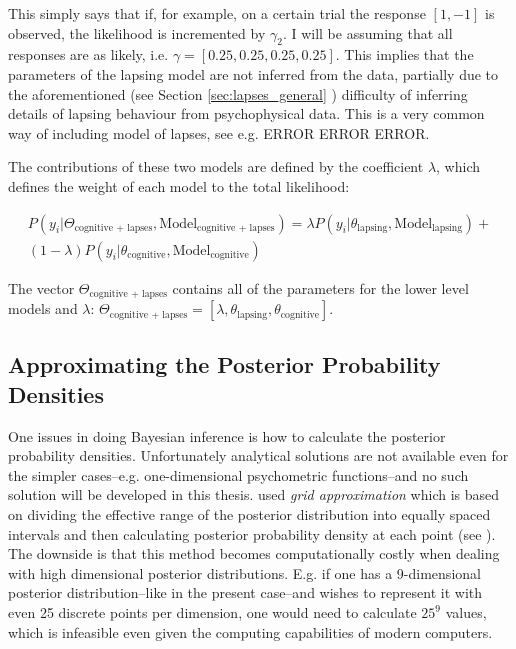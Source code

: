 \documentclass{article}\usepackage{knitr}
\begin{document}
This simply says that if, for example, on a certain trial the response $[1,-1]$ is observed, the likelihood is incremented by $\gamma_2$. I will be assuming that all responses are as likely, i.e. $\gamma = [0.25, 0.25, 0.25, 0.25]$. This implies that the parameters of the lapsing model are not inferred from the data, partially due to the aforementioned (see Section \ref{sec:lapses_general} \textit{}) difficulty of inferring details of lapsing behaviour from psychophysical data. This is a very common way of including model of lapses, see e.g. ERROR ERROR ERROR.

The contributions of these two models are defined by the coefficient $\lambda$, which defines the weight of each model to the total likelihood:

\begin{multline}
\label{eq:lower_level_hiera}
P(y_i |\Theta_{\text{cognitive + lapses}}, \text{Model}_{\text{cognitive + lapses}}) = \lambda P(y_i | \theta_{\text{lapsing}}, \text{Model}_{\text{lapsing}}) + \\ (1 - \lambda) P(y_i | \theta_{\text{cognitive}}, \text{Model}_{\text{cognitive}})
\end{multline}

The vector $\Theta_{\text{cognitive + lapses}}$ contains all of the parameters for the lower level models and $\lambda$: $\Theta_{\text{cognitive + lapses}} = [\lambda, \theta_{\text{lapsing}}, \theta_{\text{cognitive}}]$.

\subsection{Approximating the Posterior Probability Densities}

One issues in doing Bayesian inference is how to calculate the posterior probability densities. Unfortunately analytical solutions are not available even for the simpler cases--e.g. one-dimensional psychometric functions--and no such solution will be developed in this thesis. \citet{kontsevichtyler1999} used \textit{grid approximation} which is based on dividing the effective range of the posterior distribution into equally spaced intervals and then calculating posterior probability density at each point (see \citealt[p.144]{kruschke2015}). The downside is that this method becomes computationally costly when dealing with high dimensional posterior distributions. E.g. if one has a 9-dimensional posterior distribution--like in the present case--and wishes to represent it with even 25 discrete points per dimension, one would need to calculate $25^9$ values, which is infeasible even given the computing capabilities of modern computers.
\end{document}
